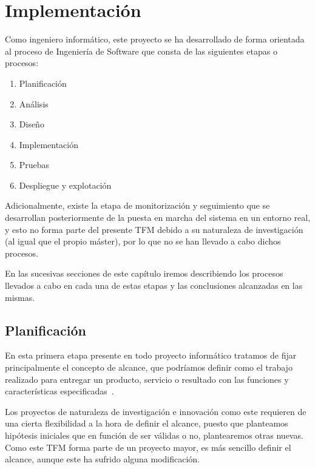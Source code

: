 \graphicspath{{capitulos/Capitulo4-Implementacion/recursos/}}

\section{Implementación} \label{capitulo:4}

Como ingeniero informático, este proyecto se ha desarrollado de forma orientada al proceso de Ingeniería de Software que consta de las siguientes etapas o procesos: 
\begin{enumerate}
	\item Planificación
	\item Análisis
	\item Diseño
	\item Implementación%
	\item Pruebas
	\item Despliegue y explotación    
\end{enumerate}
Adicionalmente, existe la etapa de monitorización y seguimiento que se desarrollan posteriormente de la puesta en marcha del sistema en un entorno real, y esto no forma parte del presente TFM debido a su naturaleza de investigación (al igual que el propio máster), por lo que no se han llevado a cabo dichos procesos.

En las sucesivas secciones de este capítulo iremos describiendo los procesos llevados a cabo en cada una de estas etapas y las conclusiones alcanzadas en las mismas.

\subsection{Planificación}
\label{sec:4:planificacion}
En esta primera etapa presente en todo proyecto informático tratamos de fijar principalmente el concepto de alcance, que podríamos definir como el trabajo realizado para entregar un producto, servicio o resultado con
las funciones y características especificadas~\cite{PMBOK}.

Los proyectos de naturaleza de investigación e innovación como este requieren de una cierta flexibilidad a la hora de definir el alcance, puesto que planteamos hipótesis iniciales que en función de ser válidas o no, plantearemos otras nuevas. Como este TFM forma parte de un proyecto mayor, es más sencillo definir el alcance, aunque este ha sufrido alguna modificación.


